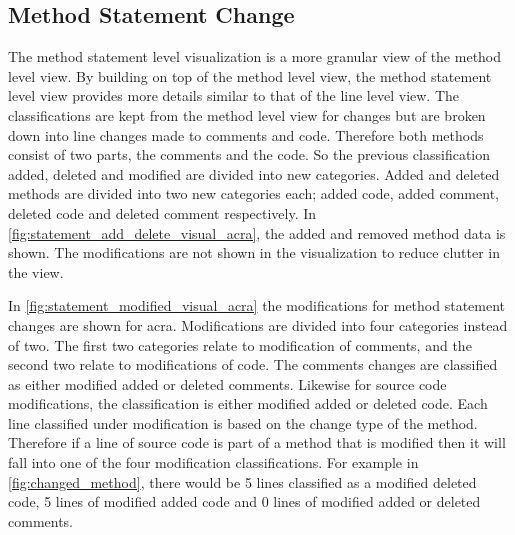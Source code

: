 
\subsection{Method Statement Change}

The method statement level visualization is a more granular view of the method level view. By building on top of the method level view, the method statement level view provides more details similar to that of the line level view. The classifications are kept from the method level view for changes but are broken down into line changes made to comments and code. Therefore both methods consist of two parts, the comments and the code. So the previous classification added, deleted and modified are divided into new categories. Added and deleted methods are divided into two new categories each; added code, added comment, deleted code and deleted comment respectively. In \autoref{fig:statement_add_delete_visual_acra}, the added and removed method data is shown. The modifications are not shown in the visualization to reduce clutter in the view.

In \autoref{fig:statement_modified_visual_acra} the modifications for method statement changes are shown for acra. Modifications are divided into four categories instead of two. The first two categories relate to modification of comments, and the second two relate to modifications of code. The comments changes are classified as either modified added or deleted comments. Likewise for source code modifications, the classification is either modified added or deleted code. Each line classified under modification is based on the change type of the method. Therefore if a line of source code is part of a method that is modified then it will fall into one of the four modification classifications. For example in \autoref{fig:changed_method}, there would be 5 lines classified as a modified deleted code, 5 lines of modified added code and 0 lines of modified added or deleted comments.


